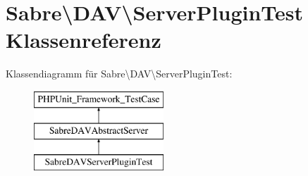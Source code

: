 \hypertarget{class_sabre_1_1_d_a_v_1_1_server_plugin_test}{}\section{Sabre\textbackslash{}D\+AV\textbackslash{}Server\+Plugin\+Test Klassenreferenz}
\label{class_sabre_1_1_d_a_v_1_1_server_plugin_test}
Klassendiagramm für Sabre\textbackslash{}D\+AV\textbackslash{}Server\+Plugin\+Test\+:\begin{figure}[H]
\begin{center}
\leavevmode
\includegraphics[height=3.000000cm]{class_sabre_1_1_d_a_v_1_1_server_plugin_test}
\end{center}
\end{figure}
